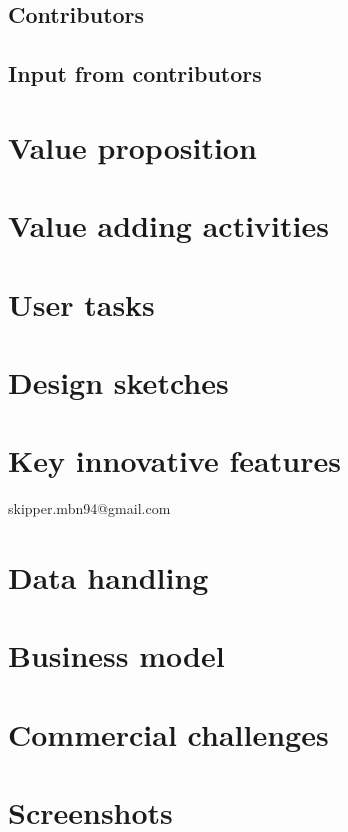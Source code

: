 \documentclass[a4paper,12pt,fleqn,dvipsnames,oneside,openright]{memoir}
\begin{document}
\section{Contributors}
\section{Input from contributors}

\chapter{Value proposition}

\chapter{Value adding activities}

\chapter{User tasks}

\chapter{Design sketches}

\chapter{Key innovative features}skipper.mbn94@gmail.com


\chapter{Data handling}

\chapter{Business model}

\chapter{Commercial challenges}

\chapter{Screenshots}

\begingroup
	\raggedright
	\printbibliography
\endgroup 
\end{document}

